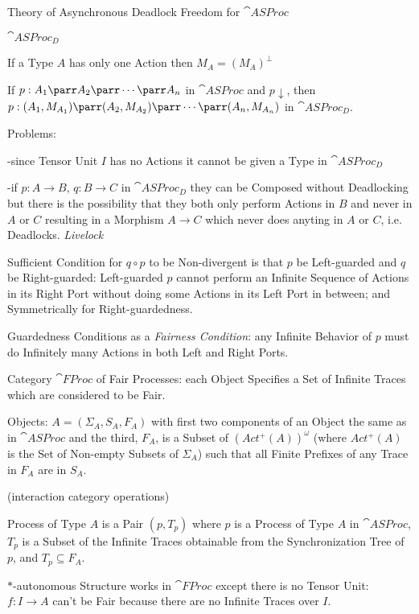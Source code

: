 Theory of Asynchronous Deadlock Freedom for $\cat{ASProc}$ %

$\cat{ASProc}_D$

If a Type $A$ has only one Action then $M_A = (M_A)^\bot$

If $p : A_1 \parr A_2 \parr \cdots \parr A_n$ in $\cat{ASProc}$ and
$p\downarrow$, then $p:(A_1,M_{A_1}) \parr (A_2,M_{A_2}) \parr \cdots
\parr (A_n,M_{A_n})$ in $\cat{ASProc}_D$.

Problems: %

-since Tensor Unit $I$ has no Actions it cannot be given a Type in
$\cat{ASProc}_D$

-if $p : A \rightarrow B$, $q : B \rightarrow C$ in $\cat{ASProc}_D$
they can be Composed without Deadlocking but there is the possibility
that they both only perform Actions in $B$ and never in $A$ or $C$
resulting in a Morphism $A \rightarrow C$ which never does anyting in
$A$ or $C$, i.e. Deadlocks. \emph{Livelock} %

Sufficient Condition for $q \circ p$ to be Non-divergent is that $p$
be Left-guarded and $q$ be Right-guarded: Left-guarded $p$ cannot
perform an Infinite Sequence of Actions in its Right Port without
doing some Actions in its Left Port in between; and Symmetrically for
Right-guardedness.

Guardedness Conditions as a \emph{Fairness Condition}: any Infinite
Behavior of $p$ must do Infinitely many Actions in both Left and Right
Ports.


Category $\cat{FProc}$ of Fair Processes: each Object Specifies a Set
of Infinite Traces which are considered to be Fair.

Objects: $A = (\Sigma_A,S_A,F_A)$ with first two components of an
Object the same as in $\cat{ASProc}$ and the third, $F_A$, is a Subset
of $(Act^+(A))^\omega$ (where $Act^+(A)$ is the Set of Non-empty
Subsets of $\Sigma_A$) such that all Finite Prefixes of any Trace in
$F_A$ are in $S_A$.

(interaction category operations) %

Process of Type $A$ is a Pair $(p,T_p)$ where $p$ is a Process of Type
$A$ in $\cat{ASProc}$, $T_p$ is a Subset of the Infinite Traces
obtainable from the Synchronization Tree of $p$, and $T_p \subseteq
F_A$.

$*$-autonomous Structure works in $\cat{FProc}$ except there is no
Tensor Unit: $f : I \rightarrow A$ can't be Fair because there are no
Infinite Traces over $I$.

